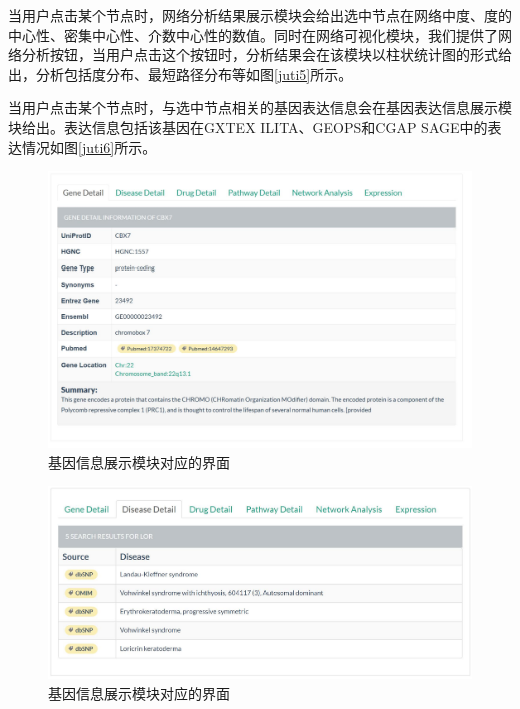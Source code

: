 当用户点击某个节点时，网络分析结果展示模块会给出选中节点在网络中度、度的中心性、密集中心性、介数中心性的数值。同时在网络可视化模块，我们提供了网络分析按钮，当用户点击这个按钮时，分析结果会在该模块以柱状统计图的形式给出，分析包括度分布、最短路径分布等如图\ref{juti5}所示。

当用户点击某个节点时，与选中节点相关的基因表达信息会在基因表达信息展示模块给出。表达信息包括该基因在GXTEX ILITA、GEOPS和CGAP SAGE中的表达情况如图\ref{juti6}所示。

\newpage


\begin{figure}[!htbp]
\centering
\includegraphics[width = 1.0\textwidth]{juti1}
\caption[fig33]{基因信息展示模块对应的界面}
\label{juti1}
\end{figure}

\begin{figure}[!bhtp]
\centering
\includegraphics[width = 1.0\textwidth]{juti2}
\caption[fig33]{基因信息展示模块对应的界面}
\label{juti2}
\end{figure}

